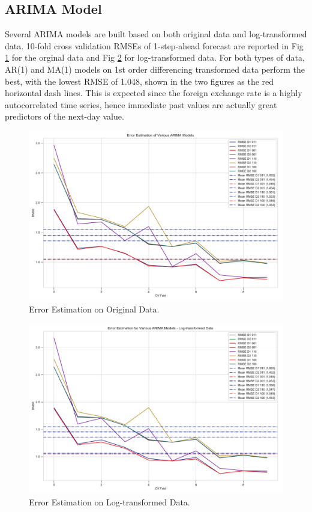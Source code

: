 \documentclass[]{article}
\begin{document}
\subsection{ARIMA Model}
Several ARIMA models are built based on both original data and log-transformed data. 10-fold cross validation RMSEs of 1-step-ahead forecast are reported in Fig \ref{fig:error_estimation_1} for the orginal data and Fig \ref{fig:error_estimation_2} for log-transformed data. For both types of data, AR(1) and MA(1) models on 1st order differencing transformed data perform the best, with the lowest RMSE of 1.048, shown in the two figures as the red horizontal dash lines. This is expected since the foreign exchange rate is a highly autocorrelated time series, hence immediate past values are actually great predictors of the next-day value.

%
\begin{figure}[ht]
	\centering
	\includegraphics[width=1\columnwidth]{../Figures/error_estimation_1.pdf}
	\caption{Error Estimation on Original Data.}
	\label{fig:error_estimation_1}
\end{figure}
%
%
\begin{figure}[ht]
	\centering
	\includegraphics[width=1\columnwidth]{../Figures/error_estimation_2.pdf}
	\caption{Error Estimation on Log-transformed Data.}
	\label{fig:error_estimation_2}
\end{figure}
%
\end{document}
